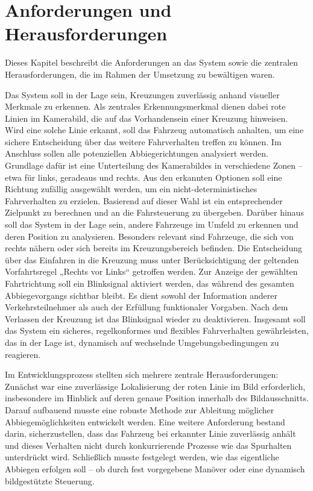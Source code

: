 
\section{Anforderungen und Herausforderungen}

Dieses Kapitel beschreibt die Anforderungen an das System sowie die zentralen Herausforderungen, 
die im Rahmen der Umsetzung zu bewältigen waren.

Das System soll in der Lage sein, Kreuzungen zuverlässig anhand visueller Merkmale zu erkennen. Als 
zentrales Erkennungsmerkmal dienen dabei rote Linien im Kamerabild, die auf das Vorhandensein einer Kreuzung 
hinweisen. Wird eine solche Linie erkannt, soll das Fahrzeug automatisch anhalten, um eine sichere Entscheidung 
über das weitere Fahrverhalten treffen zu können.
Im Anschluss sollen alle potenziellen Abbiegerichtungen analysiert werden. Grundlage dafür ist eine 
Unterteilung des Kamerabildes in verschiedene Zonen – etwa für links, geradeaus und rechts. Aus den erkannten 
Optionen soll eine Richtung zufällig ausgewählt werden, um ein nicht-deterministisches Fahrverhalten zu erzielen. 
Basierend auf dieser Wahl ist ein entsprechender Zielpunkt zu berechnen und an die Fahrsteuerung zu übergeben.
Darüber hinaus soll das System in der Lage sein, andere Fahrzeuge im Umfeld zu erkennen und deren Position zu 
analysieren. Besonders relevant sind Fahrzeuge, die sich von rechts nähern oder sich bereits im Kreuzungsbereich 
befinden. Die Entscheidung über das Einfahren in die Kreuzung muss unter Berücksichtigung der geltenden 
Vorfahrtsregel „Rechts vor Links“ getroffen werden.
Zur Anzeige der gewählten Fahrtrichtung soll ein Blinksignal aktiviert werden, das während des gesamten 
Abbiegevorgangs sichtbar bleibt. Es dient sowohl der Information anderer Verkehrsteilnehmer als auch der 
Erfüllung funktionaler Vorgaben. Nach dem Verlassen der Kreuzung ist das Blinksignal wieder zu deaktivieren.
Insgesamt soll das System ein sicheres, regelkonformes und flexibles Fahrverhalten gewährleisten, das in der 
Lage ist, dynamisch auf wechselnde Umgebungsbedingungen zu reagieren.

Im Entwicklungsprozess stellten sich mehrere zentrale Herausforderungen: Zunächst war eine zuverlässige 
Lokalisierung der roten Linie im Bild erforderlich, insbesondere im Hinblick auf deren genaue Position 
innerhalb des Bildausschnitts. Darauf aufbauend musste eine robuste Methode zur Ableitung möglicher 
Abbiegemöglichkeiten entwickelt werden. Eine weitere Anforderung bestand darin, sicherzustellen, dass das 
Fahrzeug bei erkannter Linie zuverlässig anhält und dieses Verhalten nicht durch konkurrierende Prozesse wie 
das Spurhalten unterdrückt wird. Schließlich musste festgelegt werden, wie das eigentliche Abbiegen erfolgen 
soll – ob durch fest vorgegebene Manöver oder eine dynamisch bildgestützte Steuerung.


